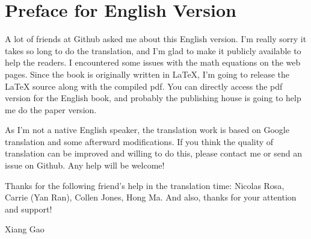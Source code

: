 \chapter*{Preface for English Version}
A lot of friends at Github asked me about this English version. I'm really sorry it takes so long to do the translation, and I'm glad to make it publicly available to help the readers. I encountered some issues with the math equations on the web pages. Since the book is originally written in LaTeX, I'm going to release the LaTeX source along with the compiled pdf. You can directly access the pdf version for the English book, and probably the publishing house is going to help me do the paper version.

As I'm not a native English speaker, the translation work is based on Google translation and some afterward modifications. If you think the quality of translation can be improved and willing to do this, please contact me or send an issue on Github. Any help will be welcome!

Thanks for the following friend's help in the translation time: Nicolas Rosa, Carrie (Yan Ran), Collen Jones, Hong Ma. And also, thanks for your attention and support!

\vspace{5cm}
\begin{flushright}
	Xiang Gao
\end{flushright}